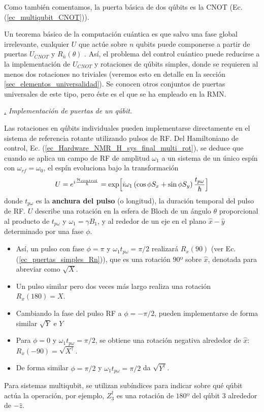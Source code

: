 \documentclass[a4paper,11pt]{book} %
\numberwithin{equation}{chapter}
\def\lp{\left(}
\def\rp{\right)}
\def\Lc{\Bigl[}
\def\Rc{\Bigr]}
\def\subsubiContadorIt{\par\addtocounter{subsubsection}{1}\underline{\it\thesubsubsection.}\hskip0.5cm \setcounter{subsubsubsectionIt}{0}}
\newcommand{\SubsubiIt}[1]{
		\subsubiContadorIt \textit{#1}
	}
\newcounter{subsubsubsectionIt}[subsubsection]
\begin{document}
Como también comentamos, la puerta básica de dos qúbits es la CNOT (Ec. (\ref{ec_multiqubit_CNOT})). 

Un teorema básico de la computación cuántica es que salvo una fase global irrelevante, cualquier $U$ que actúe sobre $n$ qubits puede componerse a partir de puertas $U_{CNOT}$ y $R_{\hat{n}}(\theta)$ \cite{bib_nielsen_chuang_2010} . Así, el problema del control cuántico puede reducirse a la implementación de $U_{CNOT}$ y rotaciones de qúbits simples, donde se requieren al menos dos rotaciones no triviales (veremos esto en detalle en la sección \ref{sec_elementos_universalidad}). Se conocen otros conjuntos de puertas universales de este tipo, pero éste es el que se ha empleado en la RMN.


			\SubsubiIt{Implementación de puertas de un qúbit.}

Las rotaciones en qúbits individuales pueden implementarse directamente en el sistema de referencia rotante utilizando pulsos de RF. Del Hamiltoniano de control, Ec. (\ref{ec_Hardware_NMR_H_sys_final_multi_rot}), se deduce que cuando se aplica un campo de RF de amplitud $\omega_1$ a un sistema de un único espín con $\omega_{rf} = \omega_0$, el espín evoluciona bajo la transformación
	\begin{equation} \label{ec_Hardware_NMR_U_arbitrario}
	U = e^{i \frac{\mathcal{H}_{control}}{\hbar}} = \exp \Lc i \omega_1 \lp  \cos \phi S_x + \sin \phi S_y \rp \frac{t_{p \omega}}{\hbar} \Rc
	\end{equation}
donde $t_{p \omega}$ es la \textbf{anchura del pulso} (o longitud), la duración temporal del pulso de RF. $U$ describe una rotación en la esfera de Bloch de un ángulo $\theta$ proporcional al producto de $t_{p\omega}$ y $\omega_1 = \gamma B_1$, y al rededor de un eje en el plano $\hat{x}-\hat{y}$ determinado por una fase $\phi$.

\begin{itemize}
	\item Así, un pulso con fase $\phi = \pi$ y $\omega_1 t_{p\omega} = \pi/2$ realizará $R_x(90)$ (ver Ec. (\ref{ec_puertas_simples_Rn})), que es una rotación $90$º sobre $\hat{x}$, denotada para abreviar como $\sqrt{X}$.
	\item Un pulso similar pero dos veces más largo realiza una rotación $R_x(180) =  X$.
	\item Cambiando la fase del pulso RF a $\phi = -\pi/2$, pueden implementarse de forma similar $\sqrt{Y}$ e $Y$
	\item Para $\phi = 0$ y $\omega_1 t_{p\omega} = \pi/2$, se obtiene una rotación negativa alrededor de $\hat{x}$: $R_x (-90) = \sqrt{X^\dagger}$.
	\item De forma similar $\phi = \pi/2$ y $\omega_1 t_{p\omega} = \pi/2$ da $\sqrt{Y^\dagger}$.
\end{itemize}
Para sistemas multiqubit, se utilizan subíndices para indicar sobre qué qúbit actúa la operación, por ejemplo, $Z^\dagger_3$ es una rotación de $180$º del qúbit 3 alrededor de $- \hat{z}$.
\end{document}
